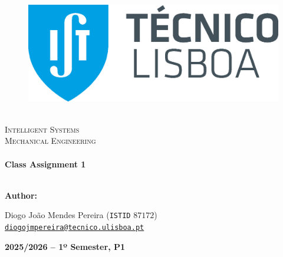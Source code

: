 \begin{center}
    \begin{figure}
        \vspace{-1.0cm}
        \includegraphics[scale = 0.3, left]{Images/IST_A.eps} %
    \end{figure}
    \mbox{}\\[2.0cm]
    \textsc{\Huge Intelligent Systems}\\[2.5cm]
    \textsc{\LARGE Mechanical Engineering}\\[2.0cm]
    \HRule\\[0.4cm]
    {\large \bf Class Assignment 1}\\[0.2cm]
    \HRule\\[1.5cm]
\end{center}

\begin{flushleft}
    \textbf{Author:}
\end{flushleft}

\begin{center}
Diogo João Mendes Pereira (\texttt{ISTID} $87172$)\\
\href{mailto:diogojmpereira@tecnico.ulisboa.pt}{\texttt{diogojmpereira@tecnico.ulisboa.pt}}\vspace{5.5cm}

\large \bf 2025/2026 -- 1º Semester, P1
\end{center}

\thispagestyle{empty}

\setcounter{page}{0}

\newpage